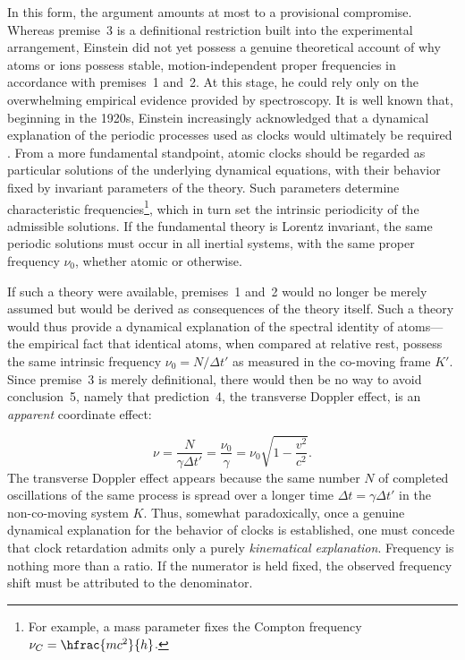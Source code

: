 \documentclass[submitted,12pt]{article}
\newcommand{\tDe}{transverse Doppler effect\xspace}
\begin{document}
%
In this form, the argument amounts at most to a provisional compromise. Whereas premise~3 is a definitional restriction built into the experimental arrangement, Einstein did not yet possess a genuine theoretical account of why atoms or ions possess stable, motion-independent proper frequencies in accordance with premises~1 and~2. At this stage, he could rely only on the overwhelming empirical evidence provided by spectroscopy. It is well known that, beginning in the 1920s, Einstein increasingly acknowledged that a dynamical explanation of the periodic processes used as clocks would ultimately be required . From a more fundamental standpoint, atomic clocks should be regarded as particular solutions of the underlying dynamical equations, with their behavior fixed by invariant parameters of the theory. Such parameters determine characteristic frequencies\footnote{For example, a mass parameter fixes the Compton frequency $\nu_C=\hfrac{mc^2}{h}$.}, which in turn set the intrinsic periodicity of the admissible solutions. If the fundamental theory is Lorentz invariant, the same periodic solutions must occur in all inertial systems, with the same proper frequency $\nu_0$, whether atomic or otherwise.

If such a theory were available, premises~1 and~2 would no longer be merely assumed but would be derived as consequences of the theory itself. Such a theory would thus provide a dynamical explanation of the spectral identity of atoms---the empirical fact that identical atoms, when compared at relative rest, possess the same intrinsic frequency $\nu_0 = N/\Delta t'$ as measured in the co-moving frame $K'$. Since premise~3 is merely definitional, there would then be no way to avoid conclusion~5, namely that prediction~4, the \tDe, is an \emph{apparent} coordinate effect:

\begin{equation}
\nu=\frac{N}{\gamma\Delta t'}= \frac{\nu_0}{\gamma} = \nu_0 \sqrt{1-\frac{v^2}{c^2}}.
\end{equation}
%
The \tDe appears because the same number $N$ of completed oscillations of the same process is spread over a longer time $\Delta t = \gamma \Delta t'$ in the non-co-moving system $K$. Thus, somewhat paradoxically, once a genuine dynamical explanation for the behavior of clocks is established, one must concede that clock retardation admits only a purely \emph{kinematical explanation}. Frequency is nothing more than a ratio. If the numerator is held fixed, the observed frequency shift must be attributed to the denominator.
\end{document}
